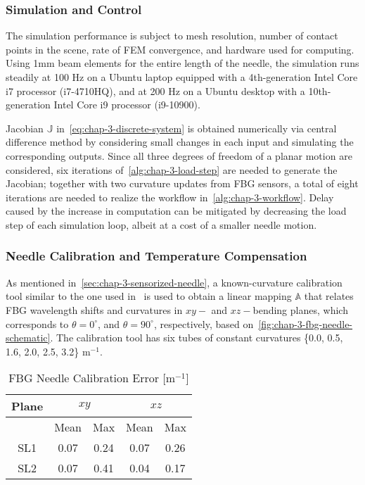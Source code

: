 \subsubsection{Simulation and Control}
\label{sec:chap-3-simulation-and-control-res}

The simulation performance is subject to mesh resolution, number of contact points in the scene, rate of FEM convergence, and hardware used for computing. Using 1mm beam elements for the entire length of the needle, the simulation runs steadily at 100 Hz on a Ubuntu laptop equipped with a 4th-generation Intel Core i7 processor (i7-4710HQ), and at 200 Hz on a Ubuntu desktop with a 10th-generation Intel Core i9 processor (i9-10900).

Jacobian $\mathbb{J}$ in~\cref{eq:chap-3-discrete-system} is obtained numerically via central difference method by considering small changes in each input and simulating the corresponding outputs. Since all three degrees of freedom of a planar motion are considered, six iterations of~\cref{alg:chap-3-load-step} are needed to generate the Jacobian; together with two curvature updates from FBG sensors, a total of eight iterations are needed to realize the workflow in~\cref{alg:chap-3-workflow}. Delay caused by the increase in computation can be mitigated by decreasing the load step of each simulation loop, albeit at a cost of a smaller needle motion. 

\subsubsection{Needle Calibration and Temperature Compensation}
\label{sec:chap-3-needle-res}
As mentioned in~\cref{sec:chap-3-sensorized-needle}, a known-curvature calibration tool similar to the one used in~\parencite{kimShapeDeterminationNeedle2017} is used to obtain a linear mapping $\mathbb{A}$ that relates FBG wavelength shifts and curvatures in $xy-$ and $xz-$bending planes, which corresponds to $\theta = 0^{\circ}$, and $\theta = 90^{\circ}$, respectively, based on~\cref{fig:chap-3-fbg-needle-schematic}. The calibration tool has six tubes of constant curvatures \{0.0, 0.5, 1.6, 2.0, 2.5, 3.2\} m$^{-1}$.

\begin{table}[b]
\centering
\caption{FBG Needle Calibration Error [m$^{-1}$]}
\begin{tabular}{||c|cc|cc|}
\hline
Plane & \multicolumn{2}{c|}{$xy$} & \multicolumn{2}{c|}{$xz$} \\ \hline
      & Mean     & Max      & Mean     & Max      \\ \hline
SL1   & 0.07     & 0.24     & 0.07     & 0.26     \\ \hline
SL2   & 0.07     & 0.41     & 0.04     & 0.17     \\ \hline
\end{tabular}
  \label{tab:chap-3-calibration-error}
\end{table}

